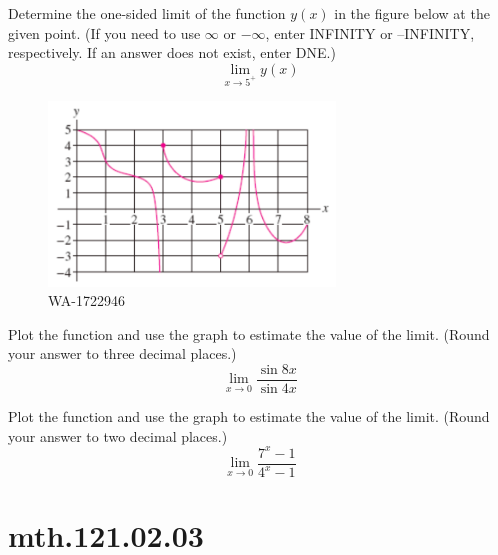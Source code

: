 \documentclass[12pt,addpoints, answers, fleqn]{exam}
\begin{document}
\begin{teacher}
\begin{questions}
Determine the one-sided limit of the function $y\left(x\right)$ in the figure below at the given point. (If you need to use $\infty$ or $-\infty$, enter INFINITY or –INFINITY, respectively. If an answer does not exist, enter DNE.)
\[
\lim_{x \to 5^+} y\left(x\right)
\]
\begin{figure}[htbp] %
   \centering
   \includegraphics[width=3in]{./graphics/1722946.pdf} 
   \caption{WA-1722946}
   \label{fig:1722946}
\end{figure}
\begin{solution}
\end{solution}

\question 	%

Plot the function and use the graph to estimate the value of the limit. (Round your answer to three decimal places.)
\[
\lim_{x \to 0} \frac{\sin 8x}{\sin 4x}
\]
\begin{solution}
\end{solution}



\question 	%

Plot the function and use the graph to estimate the value of the limit. (Round your answer to two decimal places.)
\[
\lim_{x \to 0} \frac{7^x - 1}{4^x - 1}
\]
\begin{solution}
\end{solution}


\end{questions}
\end{teacher}






\vfill
\pagebreak





\section{mth.121.02.03}
\end{document}
